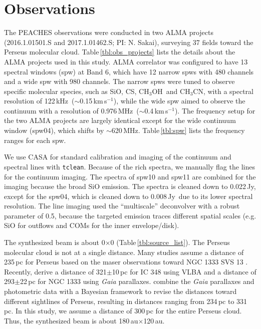 \documentclass[twocolumn]{aastex62}
\newcommand{\kms}{\mbox{\,km\,s$^{-1}$}}
\newcommand{\mhz}{\mbox{\,MHz}}
\newcommand{\khz}{\mbox{\,kHz}}
\newcommand{\jy}{\mbox{\,Jy}}
\newcommand{\methanol}{\mbox{CH$_{3}$OH}}
\newcommand{\methylcyanide}{\mbox{CH$_{3}$CN}}
\begin{document}
\section{Observations}
\label{sec:observations}
The PEACHES observations were conducted in two ALMA projects (2016.1.01501.S and 2017.1.01462.S; PI: N. Sakai), surveying 37 fields toward the Perseus molecular cloud.  Table\,\ref{tbl:obs_projects} lists the details about the ALMA projects used in this study.  ALMA correlator was configured to have 13 spectral windows (spw) at Band 6, which have 12 narrow spws with 480 channels and a wide spw with 980 channels.  The narrow spws were tuned to observe specific molecular species, such as SiO, CS, \methanol\ and \methylcyanide, with a spectral resolution of 122\khz\ ($\sim$0.15\kms), while the wide spw aimed to observe the continuum with a resolution of 0.976\mhz\ ($\sim$0.4\kms).  The frequency setup for the two ALMA projects are largely identical except for the wide continuum window (spw04), which shifts by $\sim$620\mhz.  Table\,\ref{tbl:spw} lists the frequency ranges for each spw.

We use CASA \citep{2007ASPC..376..127M} for standard calibration and imaging of the continuum and spectral lines with \texttt{tclean}.  Because of the rich spectra, we manually flag the lines for the continuum imaging.  The spectra of spw10 and spw11 are combined for the imaging because the broad SiO emission.  The spectra is cleaned down to 0.022\jy, except for the spw04, which is cleaned down to 0.008\jy\ due to its lower spectral resolution.  The line imaging used the ``multiscale'' deconvolver with a robust parameter of 0.5, because the targeted emission traces different spatial scales (e.g. SiO for outflows and COMs for the inner envelope/disk).

The synthesized beam is about 0$\times$0 (Table\,\ref{tbl:source_list}).  The Perseus molecular cloud is not at a single distance.  Many studies assume a distance of 235\,pc for Perseus based on the maser observations toward NGC 1333 SVS 13 \citep{2008PASJ...60...37H}.  Recently, \citet{2018ApJ...865...73O} derive a distance of 321$\pm$10\,pc for IC 348 using VLBA and a distance of 293$\pm$22\,pc for NGC 1333 using \textit{Gaia} parallaxes.  \citet{2020AA...633A..51Z} combine the \textit{Gaia} parallaxes and photometric data with a Bayesian framework to revise the distances toward different sightlines of Perseus, resulting in distances ranging from 234\,pc to 331\,pc.  In this study, we assume a distance of 300\,pc for the entire Perseus cloud.  Thus, the synthesized beam is about 180\,au$\times$120\,au.
\end{document}
